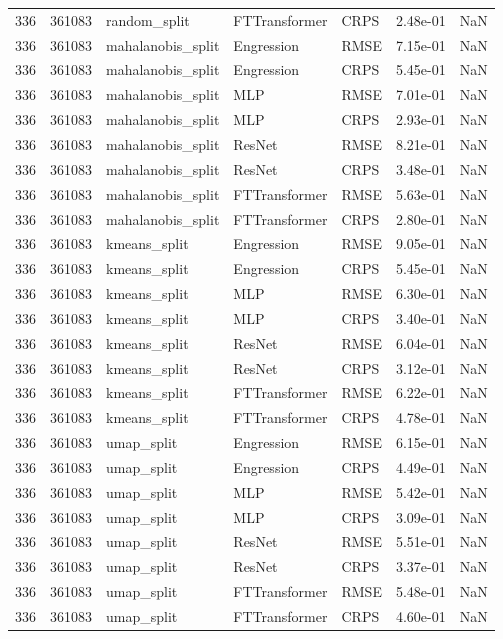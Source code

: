\begin{tabular}{rrlllrr}
336 & 361083 & random\_split & FTTransformer & CRPS & 2.48e-01 & NaN \\
336 & 361083 & mahalanobis\_split & Engression & RMSE & 7.15e-01 & NaN \\
336 & 361083 & mahalanobis\_split & Engression & CRPS & 5.45e-01 & NaN \\
336 & 361083 & mahalanobis\_split & MLP & RMSE & 7.01e-01 & NaN \\
336 & 361083 & mahalanobis\_split & MLP & CRPS & 2.93e-01 & NaN \\
336 & 361083 & mahalanobis\_split & ResNet & RMSE & 8.21e-01 & NaN \\
336 & 361083 & mahalanobis\_split & ResNet & CRPS & 3.48e-01 & NaN \\
336 & 361083 & mahalanobis\_split & FTTransformer & RMSE & 5.63e-01 & NaN \\
336 & 361083 & mahalanobis\_split & FTTransformer & CRPS & 2.80e-01 & NaN \\
336 & 361083 & kmeans\_split & Engression & RMSE & 9.05e-01 & NaN \\
336 & 361083 & kmeans\_split & Engression & CRPS & 5.45e-01 & NaN \\
336 & 361083 & kmeans\_split & MLP & RMSE & 6.30e-01 & NaN \\
336 & 361083 & kmeans\_split & MLP & CRPS & 3.40e-01 & NaN \\
336 & 361083 & kmeans\_split & ResNet & RMSE & 6.04e-01 & NaN \\
336 & 361083 & kmeans\_split & ResNet & CRPS & 3.12e-01 & NaN \\
336 & 361083 & kmeans\_split & FTTransformer & RMSE & 6.22e-01 & NaN \\
336 & 361083 & kmeans\_split & FTTransformer & CRPS & 4.78e-01 & NaN \\
336 & 361083 & umap\_split & Engression & RMSE & 6.15e-01 & NaN \\
336 & 361083 & umap\_split & Engression & CRPS & 4.49e-01 & NaN \\
336 & 361083 & umap\_split & MLP & RMSE & 5.42e-01 & NaN \\
336 & 361083 & umap\_split & MLP & CRPS & 3.09e-01 & NaN \\
336 & 361083 & umap\_split & ResNet & RMSE & 5.51e-01 & NaN \\
336 & 361083 & umap\_split & ResNet & CRPS & 3.37e-01 & NaN \\
336 & 361083 & umap\_split & FTTransformer & RMSE & 5.48e-01 & NaN \\
336 & 361083 & umap\_split & FTTransformer & CRPS & 4.60e-01 & NaN \\

\end{tabular}
